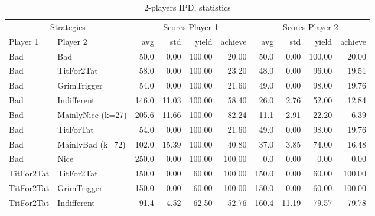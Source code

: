 \documentclass[journal,a4paper,10pt,twoside]{IEEEtran} %
\begin{document}

\begin{table}[ht]
	\caption{2-players IPD, statistics}
	\label{tab:ipd2p}
	\centering
	\begin{tabular}{ll|rrrr|rrrr}	\toprule
		\multicolumn{2}{c}{Strategies}        & \multicolumn{4}{c}{Scores Player 1} & \multicolumn{4}{c}{Scores Player 2} \\
		Player 1          & Player 2          &   avg &   std &  yield &    achieve &   avg &   std &  yield &    achieve \\ \midrule
		Bad               & Bad               &  50.0 &  0.00 & 100.00 &      20.00 &  50.0 &  0.00 & 100.00 &      20.00 \\
		Bad               & TitFor2Tat        &  58.0 &  0.00 & 100.00 &      23.20 &  48.0 &  0.00 &  96.00 &      19.51 \\
		Bad               & GrimTrigger       &  54.0 &  0.00 & 100.00 &      21.60 &  49.0 &  0.00 &  98.00 &      19.76 \\
		Bad               & Indifferent       & 146.0 & 11.03 & 100.00 &      58.40 &  26.0 &  2.76 &  52.00 &      12.84 \\
		Bad               & MainlyNice (k=27) & 205.6 & 11.66 & 100.00 &      82.24 &  11.1 &  2.91 &  22.20 &       6.39 \\
		Bad               & TitForTat         &  54.0 &  0.00 & 100.00 &      21.60 &  49.0 &  0.00 &  98.00 &      19.76 \\
		Bad               & MainlyBad (k=72)  & 102.0 & 15.39 & 100.00 &      40.80 &  37.0 &  3.85 &  74.00 &      16.48 \\
		Bad               & Nice              & 250.0 &  0.00 & 100.00 &     100.00 &   0.0 &  0.00 &   0.00 &       0.00 \\
		TitFor2Tat        & TitFor2Tat        & 150.0 &  0.00 &  60.00 &     100.00 & 150.0 &  0.00 &  60.00 &     100.00 \\
		TitFor2Tat        & GrimTrigger       & 150.0 &  0.00 &  60.00 &     100.00 & 150.0 &  0.00 &  60.00 &     100.00 \\
		TitFor2Tat        & Indifferent       &  91.4 &  4.52 &  62.50 &      52.76 & 160.4 & 11.19 &  79.57 &      79.78 \\

\end{tabular}
\end{table}
\end{document}
